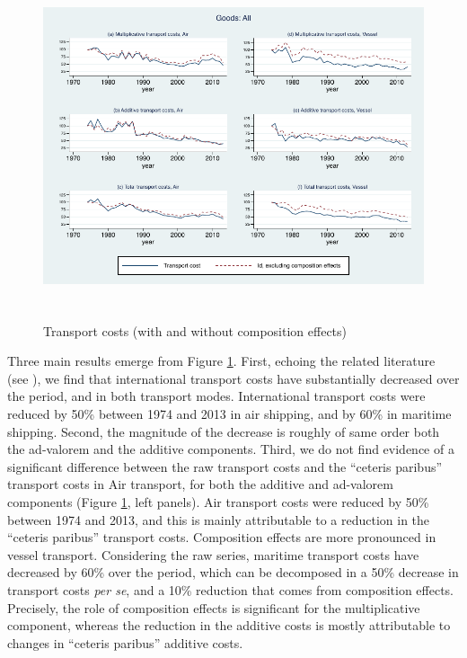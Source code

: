 \documentclass[a4paper,11pt]{article}
\begin{document}
\begin{figure}[htbp]
\caption{Transport costs (with and without composition effects)}
\label{fig:totalTC_compeffects_excl}
\begin{center}
\includegraphics[height=4in]
{graph_composition_all.pdf}
\end{center}
\end{figure}

Three main results emerge from Figure \ref{fig:totalTC_compeffects_excl}. First, echoing the related literature (see \citealp{Lafourcade_Thisse}), we find that international transport costs have substantially decreased over the period, and in both transport modes. International transport costs were reduced by 50\% between 1974 and 2013 in air shipping, and by 60\% in maritime shipping. Second, the magnitude of the decrease is roughly of same order both the ad-valorem and the additive components. Third, we do not find evidence of a significant difference between the raw transport costs and the ``ceteris paribus'' transport costs in Air transport, for both the additive and ad-valorem components (Figure \ref{fig:totalTC_compeffects_excl}, left panels). Air transport costs were reduced by 50\% between 1974 and 2013, and this is mainly attributable to a reduction in the ``ceteris paribus'' transport costs. Composition effects are more pronounced in vessel transport. Considering the raw series, maritime transport costs have decreased by 60\% over the period, which can be decomposed in a 50\% decrease in transport costs \textit{per se}, and a 10\% reduction that comes from composition effects. Precisely, the role of composition effects is significant for the multiplicative component, whereas the reduction in the additive costs is mostly attributable to changes in ``ceteris paribus'' additive costs.
\end{document}
